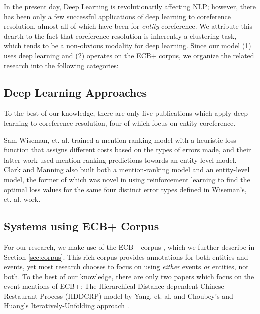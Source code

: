 \documentclass[11pt,a4paper]{article}
\begin{document}

In the present day, Deep Learning is revolutionarily affecting NLP; however, there has been only a few successful applications of deep learning to coreference resolution, almost all of which have been for \textit{entity} coreference.  We attribute this dearth to the fact that coreference resolution is inherently a clustering task, which tends to be a non-obvious modality for deep learning.  Since our model (1) uses deep learning and (2) operates on the ECB+ corpus, we organize the related research into the following categories:

\subsection{Deep Learning Approaches}
To the best of our knowledge, there are only five publications which apply deep learning to coreference resolution, four of which focus on entity coreference.

Sam Wiseman, et. al.  trained a mention-ranking model with a heuristic loss function that assigns different costs based on the types of errors made, and their latter work used mention-ranking predictions towards an entity-level model.
Clark and Manning  also built both a mention-ranking model and an entity-level model, the former of which was novel in using reinforcement learning to find the optimal loss values for the same four distinct error types defined in Wiseman's, et. al.  work.

\subsection{Systems using ECB+ Corpus}
For our research, we make use of the ECB+ corpus \cite{ECB+}, which we further describe in Section \ref{sec:corpus}.  This rich corpus provides annotations for both entities and events, yet most research chooses to focus on using \textit{either} events \textit{or} entities, not both.  To the best of our knowledge, there are only two papers which focus on the event mentions of ECB+: The Hierarchical Distance-dependent Chinese Restaurant Process (HDDCRP) model by Yang, et. al.  and Choubey's and Huang's Iteratively-Unfolding approach .
\end{document}
